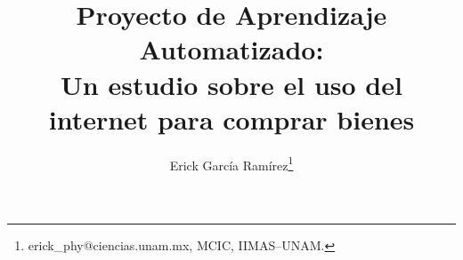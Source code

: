 \documentclass[letterpaper,11pt]{article}
\begin{document}
\title{Proyecto de Aprendizaje Automatizado:\\
{\Large Un estudio sobre el uso del internet para comprar bienes}}
\author{Erick García Ramírez\footnote{
erick\_phy@ciencias.unam.mx, MCIC, IIMAS--UNAM.}}

\maketitle
\begin{abstract}
\noindent 
\end{abstract}

\end{document}
